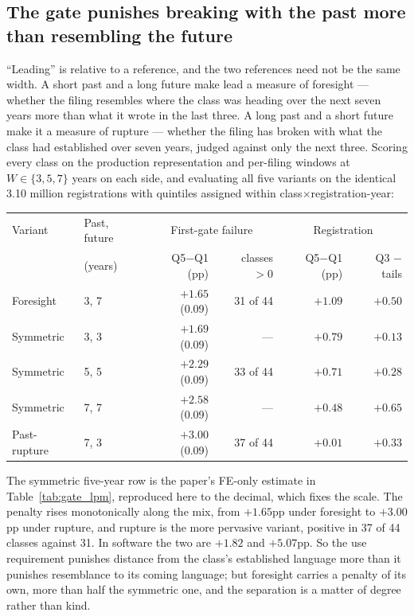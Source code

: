 \documentclass[11pt]{article}
\begin{document}
\subsection{The gate punishes breaking with the past more than resembling the future}\label{app:wmix}

``Leading'' is relative to a reference, and the two references need not be
the same width. A short past and a long future make lead a measure of
foresight --- whether the filing resembles where the class was heading over
the next seven years more than what it wrote in the last three. A long past
and a short future make it a measure of rupture --- whether the filing has
broken with what the class had established over seven years, judged against
only the next three. Scoring every class on the production representation
and per-filing windows at $W \in \{3, 5, 7\}$ years on each side, and
evaluating all five variants on the identical 3.10 million registrations
with quintiles assigned within class$\times$registration-year:

\begin{center}\small
\begin{tabular}{llrrrr}
\toprule
Variant & Past, future & \multicolumn{2}{c}{First-gate failure} & \multicolumn{2}{c}{Registration} \\
 & (years) & Q5$-$Q1 (pp) & classes $>0$ & Q5$-$Q1 (pp) & Q3 $-$ tails \\
\midrule
Foresight     & 3, 7 & $+1.65$ (0.09) & 31 of 44 & $+1.09$ & $+0.50$ \\
Symmetric     & 3, 3 & $+1.69$ (0.09) & ---      & $+0.79$ & $+0.13$ \\
Symmetric     & 5, 5 & $+2.29$ (0.09) & 33 of 44 & $+0.71$ & $+0.28$ \\
Symmetric     & 7, 7 & $+2.58$ (0.09) & ---      & $+0.48$ & $+0.65$ \\
Past-rupture  & 7, 3 & $+3.00$ (0.09) & 37 of 44 & $+0.01$ & $+0.33$ \\
\bottomrule
\end{tabular}
\end{center}

\noindent The symmetric five-year row is the paper's FE-only estimate in
Table~\ref{tab:gate_lpm}, reproduced here to the decimal, which fixes the
scale. The penalty rises monotonically along the mix, from $+1.65$pp under
foresight to $+3.00$pp under rupture, and rupture is the more pervasive
variant, positive in 37 of 44 classes against 31. In software the two are
$+1.82$ and $+5.07$pp. So the use requirement punishes distance from the
class's established language more than it punishes resemblance to its
coming language; but foresight carries a penalty of its own, more than half
the symmetric one, and the separation is a matter of degree rather than
kind.
\end{document}
